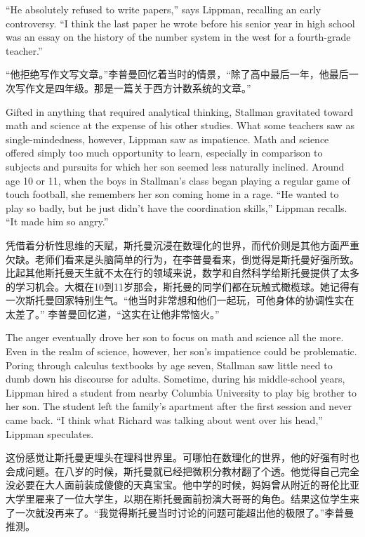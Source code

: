 \ifdefined\eng
``He absolutely refused to write papers,'' says Lippman, recalling an early controversy. ``I think the last paper he wrote before his senior year in high school was an essay on the history of the number system in the west for a fourth-grade teacher.''
\fi

\ifdefined\chs
``他拒绝写作文写文章。''李普曼回忆着当时的情景，``除了高中最后一年，他最后一次写作文是四年级。那是一篇关于西方计数系统的文章。''
\fi

\ifdefined\eng
Gifted in anything that required analytical thinking, Stallman gravitated toward math and science at the expense of his other studies. What some teachers saw as single-mindedness, however, Lippman saw as impatience. Math and science offered simply too much opportunity to learn, especially in comparison to subjects and pursuits for which her son seemed less naturally inclined. Around age 10 or 11, when the boys in Stallman's class began playing a regular game of touch football, she remembers her son coming home in a rage. ``He wanted to play so badly, but he just didn't have the coordination skills,'' Lippman recalls. ``It made him so angry.''
\fi

\ifdefined\chs
凭借着分析性思维的天赋，斯托曼沉浸在数理化的世界，而代价则是其他方面严重欠缺。老师们看来是头脑简单的行为，在李普曼看来，倒觉得是斯托曼好强所致。比起其他斯托曼天生就不太在行的领域来说，数学和自然科学给斯托曼提供了太多的学习机会。大概在10到11岁那会，斯托曼的同学们都在玩触式橄榄球。她记得有一次斯托曼回家特别生气。``他当时非常想和他们一起玩，可他身体的协调性实在太差了。'' 李普曼回忆道，``这实在让他非常恼火。''
\fi

\ifdefined\eng
The anger eventually drove her son to focus on math and science all the more. Even in the realm of science, however, her son's impatience could be problematic. Poring through calculus textbooks by age seven, Stallman saw little need to dumb down his discourse for adults. Sometime, during his middle-school years, Lippman hired a student from nearby Columbia University to play big brother to her son. The student left the family's apartment after the first session and never came back. ``I think what Richard was talking about went over his head,'' Lippman speculates.
\fi

\ifdefined\chs
这份感觉让斯托曼更埋头在理科世界里。可哪怕在数理化的世界，他的好强有时也会成问题。在八岁的时候，斯托曼就已经把微积分教材翻了个透。他觉得自己完全没必要在大人面前装成傻傻的天真宝宝。他中学的时候，妈妈曾从附近的哥伦比亚大学里雇来了一位大学生，以期在斯托曼面前扮演大哥哥的角色。结果这位学生来了一次就没再来了。``我觉得斯托曼当时讨论的问题可能超出他的极限了。''李普曼推测。
\fi

